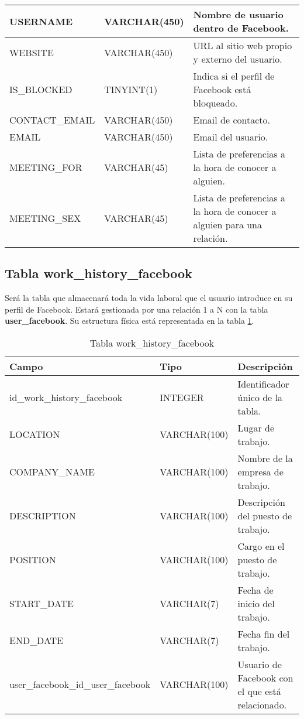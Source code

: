 \begin{center}
\begin{longtable}{|l|l|p{65mm} |}
USERNAME & VARCHAR(450) & Nombre de usuario dentro de Facebook. \\ \hline
WEBSITE & VARCHAR(450) & URL al sitio web propio y externo del usuario. \\ \hline
IS\_BLOCKED & TINYINT(1) & Indica si el perfil de Facebook está bloqueado. \\ \hline
CONTACT\_EMAIL & VARCHAR(450) & Email de contacto.  \\ \hline
EMAIL & VARCHAR(450) & Email del usuario. \\ \hline
MEETING\_FOR & VARCHAR(45) & Lista de preferencias a la hora de conocer a alguien. \\ \hline
MEETING\_SEX & VARCHAR(45) & Lista de preferencias a la hora de conocer a alguien para una relación. \\ \hline
\end{longtable}
\end{center}

\subsection{Tabla work\_history\_facebook}
Será la tabla que almacenará toda la vida laboral que el usuario introduce en su perfil de Facebook. Estará gestionada por una relación 1 a N con la tabla \textbf{user\_facebook}. Su estructura física está representada en la tabla \ref{tabWorkHistoryFacebook}.
\bigskip
\par
\begin{table}[h]
\begin{center}
\begin{tabular}{| l | l | p{60mm} |}\hline
\textbf{Campo}&\textbf{Tipo}&\textbf{Descripción} \\ \hline
id\_work\_history\_facebook & INTEGER & Identificador único de la tabla. \\ \hline
LOCATION & VARCHAR(100) & Lugar de trabajo. \\ \hline
COMPANY\_NAME & VARCHAR(100) &  Nombre de la empresa de trabajo.\\ \hline
DESCRIPTION & VARCHAR(100) & Descripción del puesto de trabajo. \\ \hline
POSITION & VARCHAR(100) &  Cargo en el puesto de trabajo. \\ \hline
START\_DATE & VARCHAR(7) &  Fecha de inicio del trabajo. \\ \hline
END\_DATE & VARCHAR(7) & Fecha fin del trabajo. \\ \hline
user\_facebook\_id\_user\_facebook & VARCHAR(100) & Usuario de Facebook con el que está relacionado. \\ \hline
\end{tabular}
\end{center}
\caption{Tabla work\_history\_facebook} \label{tabWorkHistoryFacebook}
\end{table}

